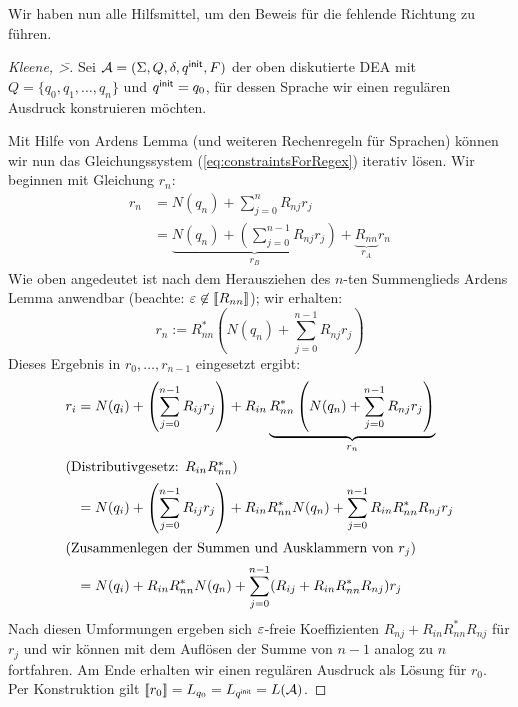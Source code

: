 
\medskip

Wir haben nun alle Hilfsmittel, um den Beweis für die fehlende Richtung zu führen.

\begin{proof}[Kleene, \=>]
  Sei $\mathcal{A}=(\Sigma,{Q},\delta,q^\mathsf{init},F)$ der oben diskutierte \acs*{DEA} mit $Q = \{q_0,q_1,\dots,q_n\}$ und $q^\mathsf{init}=q_0$, für dessen Sprache wir einen regulären Ausdruck konstruieren möchten.
  
  Mit Hilfe von Ardens Lemma (und weiteren Rechenregeln für Sprachen) können wir nun das Gleichungssystem (\ref{eq:constraintsForRegex}) iterativ lösen.
    Wir beginnen mit Gleichung $r_n$:
    \begin{align*}
      r_n &= N(q_n) + \sum_{j = 0}^n R_{nj} r_j \\
          &= \underbrace{N(q_n) + \left (\sum_{j = 0}^{n-1} R_{nj} r_j \right)}_{r_B} + \underbrace{R_{nn}}_{r_A} r_n
    \end{align*}
    Wie oben angedeutet ist nach dem Herausziehen des $n$-ten Summenglieds Ardens Lemma anwendbar (beachte: $\varepsilon \not \in [\![ R_{nn} ]\!]$); wir erhalten:
    \begin{displaymath}
      r_n := R_{nn}^*\left(N(q_n) + \sum_{j = 0}^{n-1} R_{nj} r_j  \right)
    \end{displaymath}
    Dieses Ergebnis in $r_0,\ldots,r_{n-1}$ eingesetzt ergibt:
    \begin{align*}
      r_i &= N(q_i) + \left (\sum_{j = 0}^{n-1} R_{ij} r_j \right) + R_{in} \underbrace{R_{nn}^*\left(N(q_n) + \sum_{j = 0}^{n-1} R_{nj} r_j  \right)}_{r_n} \\
      \intertext{(Distributivgesetz: $R_{in}R_{nn}^*$)}
          &= N(q_i) + \left (\sum_{j = 0}^{n-1} R_{ij} r_j \right) + R_{in}R_{nn}^*N(q_n) + \sum_{j = 0}^{n-1} R_{in}R_{nn}^*R_{nj} r_j  \\
      \intertext{(Zusammenlegen der Summen und Ausklammern von $r_j$)}
          &= N(q_i) + R_{in}R_{nn}^*N(q_n) + \sum_{j = 0}^{n-1} (R_{ij} + R_{in}R_{nn}^*R_{nj}) r_j
    \end{align*}
  Nach diesen Umformungen ergeben sich $\varepsilon$-freie Koeffizienten $R_{nj} + R_{in}R_{nn}^*R_{nj}$ für $r_j$ und wir können mit dem Auflösen der Summe von $n-1$ analog zu $n$ fortfahren.
  Am Ende erhalten wir einen regulären Ausdruck als Lösung für $r_0$.
  Per Konstruktion gilt $[\![ r_0 ]\!] = L_{q_0} = L_{q^\mathsf{init}} = L(\mathcal{A})$.
  \end{proof}
    

